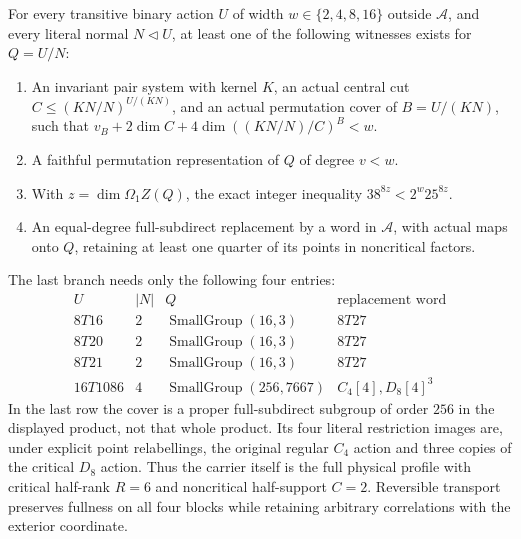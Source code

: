 \begin{lemma}\label{lem:binary-finite-menu}
For every transitive binary action $U$ of width $w\in\{2,4,8,16\}$
outside $\mathcal A$, and every literal normal $N\lhd U$, at least
one of the following witnesses exists for $Q=U/N$:
\begin{enumerate}
\item An invariant pair system with kernel $K$, an actual central cut
$C\leq(KN/N)^{U/(KN)}$, and an actual permutation cover of $B=U/(KN)$,
such that $v_B+2\dim C+4\dim((KN/N)/C)^B<w$.
\item A faithful permutation representation of $Q$ of degree $v<w$.
\item With $z=\dim\Omega_1Z(Q)$, the exact integer inequality
$38^{8z}<2^w25^{8z}$.
\item An equal-degree full-subdirect replacement by a word in
$\mathcal A$, with actual maps onto $Q$, retaining at least one
quarter of its points in noncritical factors.
\end{enumerate}
The last branch needs only the following four entries:
\[
\begin{array}{c|c|c|l}
 U&|N|&Q&\text{replacement word}\\\hline
 8T16&2&\operatorname{SmallGroup}(16,3)&8T27\\
 8T20&2&\operatorname{SmallGroup}(16,3)&8T27\\
 8T21&2&\operatorname{SmallGroup}(16,3)&8T27\\
 16T1086&4&\operatorname{SmallGroup}(256,7667)&C_4[4],D_8[4]^3
\end{array}
\]
In the last row the cover is a proper full-subdirect subgroup of order
$256$ in the displayed product, not that whole product.  Its four literal
restriction images are, under explicit point relabellings, the original
regular $C_4$ action and three copies of the critical $D_8$ action.  Thus
the carrier itself is the full physical profile with critical half-rank
$R=6$ and noncritical half-support $C=2$.  Reversible transport preserves
fullness on all four blocks while retaining arbitrary correlations with
the exterior coordinate.
\end{lemma}
